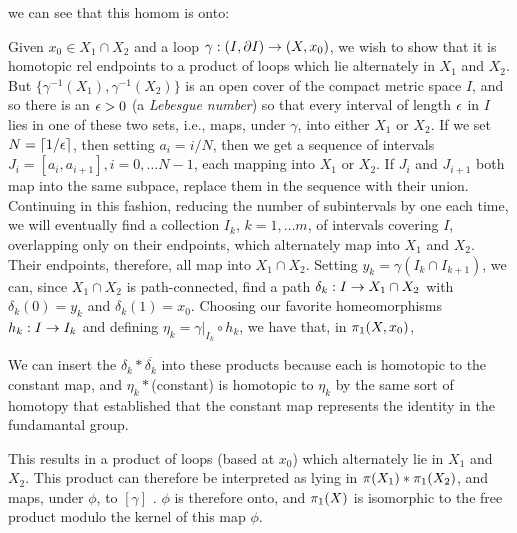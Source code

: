 
we can see that this homom is onto:

\msk

Given $x_0\in X_1\cap X_2$ and a loop $\gamma:(I,\partial I)\rightarrow (X,x_0)$, 
we wish to show that it is homotopic rel endpoints to a product of
loops which lie alternately in $X_1$ and $X_2$. But 
$\{\gamma^{-1}(X_1),\gamma^{-1}(X_2)\}$ is an open cover of the compact
metric space $I$, and so there is an $\epsilon > 0$  (a {\it Lebesgue number})
so that every interval of
length $\epsilon$ in $I$ lies in one of these two sets, i.e., maps, under $\gamma$,
into either $X_1$ or $X_2$. If we set $N=\lceil 1/\epsilon\rceil$, then 
setting $a_i=i/N$, then we get a sequence of intervals $J_i=[a_i,a_{i+1}], i=0,\ldots N-1$, 
each mapping
into $X_1$ or $X_2$. If $J_i$ and $J_{i+1}$ both map into the same subpace,
replace them in the sequence with their union. Continuing in this fashion, reducing the number of 
subintervals by one each time, we will eventually
find a collection $I_k$, $k=1,\ldots m$, of intervals covering $I$, 
overlapping only on their
endpoints, which alternately map into $X_1$ and $X_2$. Their endpoints, 
therefore, all map into $X_1\cap X_2$. Setting $y_k=\gamma(I_k\cap I_{k+1})$,
we can, since $X_1\cap X_2$ is path-connected, find a path $\delta_k:I\rightarrow X_1\cap X_2$ 
with $\delta_k(0)=y_k$ and $\delta_k(1)=x_0$. Choosing our favorite homeomorphisms
$h_k:I\rightarrow I_k$ and defining $\eta_k=\gamma|_{I_k}\circ h_k$, we have that, in $\pi_1(X,x_0)$,




We can insert the $\delta_k*\overline{\delta_k}$ into these products because each is
homotopic to the constant map, and $\eta_k*$(constant) is homotopic to $\eta_k$ by the same sort of homotopy
that established that the constant map represents the identity in the fundamantal group.

\msk

This results in a product of loops (based at $x_0$) which alternately lie in $X_1$ and $X_2$. This product can
therefore be interpreted as lying in $\pi(X_1)*\pi_1(X_2)$, and maps, under $\phi$, to $[\gamma]$ .
$\phi$ is therefore onto, and
$\pi_1(X)$ is isomorphic to the free product modulo the kernel of this map $\phi$. 

